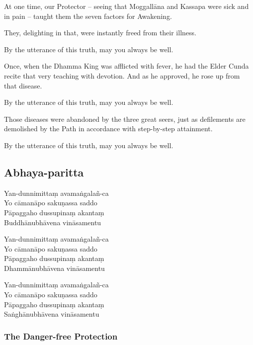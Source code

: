 At one time, our Protector -- seeing that Moggallāna and Kassapa were sick and
in pain -- taught them the seven factors for Awakening.

They, delighting in that, were instantly freed from their illness.

By the utterance of this truth, may you always be well.

Once, when the Dhamma King was afflicted with fever, he had the Elder Cunda
recite that very teaching with devotion. And as he approved, he rose up from
that disease.

By the utterance of this truth, may you always be well.

Those diseases were abandoned by the three great seers, just as defilements are
demolished by the Path in accordance with step-by-step attainment.

By the utterance of this truth, may you always be well.

\subsection{Abhaya-paritta}
\label{yan-dunnimittam}


\begin{paritta}
Yan-dunnimittaṃ avamaṅgalañ-ca\\
Yo cāmanāpo sakuṇassa saddo\\
Pāpaggaho dussupinaṃ akantaṃ\\
Buddhānubhāvena vināsamentu

Yan-dunnimittaṃ avamaṅgalañ-ca\\
Yo cāmanāpo sakuṇassa saddo\\
Pāpaggaho dussupinaṃ akantaṃ\\
Dhammānubhāvena vināsamentu

Yan-dunnimittaṃ avamaṅgalañ-ca\\
Yo cāmanāpo sakuṇassa saddo\\
Pāpaggaho dussupinaṃ akantaṃ\\
Saṅghānubhāvena vināsamentu
\end{paritta}

\bigskip

{\centering
\par}

\subsubsection{The Danger-free Protection}

